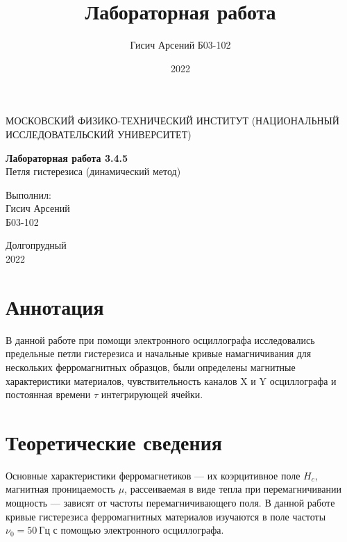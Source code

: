 \documentclass[a4paper, 12pt]{article}
\title{Лабораторная работа}
\author{Гисич Арсений Б03-102}
\date{2022}
\begin{document}
	\begin{center}
		{\large МОСКОВСКИЙ ФИЗИКО-ТЕХНИЧЕСКИЙ ИНСТИТУТ (НАЦИОНАЛЬНЫЙ ИССЛЕДОВАТЕЛЬСКИЙ УНИВЕРСИТЕТ)}
	\end{center}
	\vspace{5 cm}
	{\Large
		\begin{center}
			{\bf Лабораторная работа 3.4.5}\\[0.2 cm]
			Петля гистерезиса (динамический метод)
		\end{center}
	}
	\vspace{4 cm}
	\begin{flushright}
		{\Large Выполнил: \\
			\vspace{0.2 cm}
			Гисич Арсений \\
			\vspace{0.2 cm}
			Б03-102 \\}
	\end{flushright}
	\vspace{9 cm}
	\begin{center}
		Долгопрудный\\[0.1 cm]
		2022
	\end{center}
\thispagestyle{empty}

\section{Аннотация}

В данной работе при помощи электронного осциллографа исследовались предельные петли гистерезиса и начальные кривые намагничивания для нескольких ферромагнитных образцов, были определены магнитные характеристики материалов, чувствительность каналов X и Y осциллографа и постоянная времени $\tau$ интегрирующей ячейки.

\section{Теоретические сведения}

Основные характеристики
ферромагнетиков — их коэрцитивное поле $H_c$, магнитная проницаемость
$\mu$, рассеиваемая в виде тепла при перемагничивании мощность — зависят
от частоты перемагничивающего поля. В данной работе кривые гистерезиса ферромагнитных материалов изучаются в поле частоты $\nu_0 = 50~Гц$
с помощью электронного осциллографа.
\end{document}
